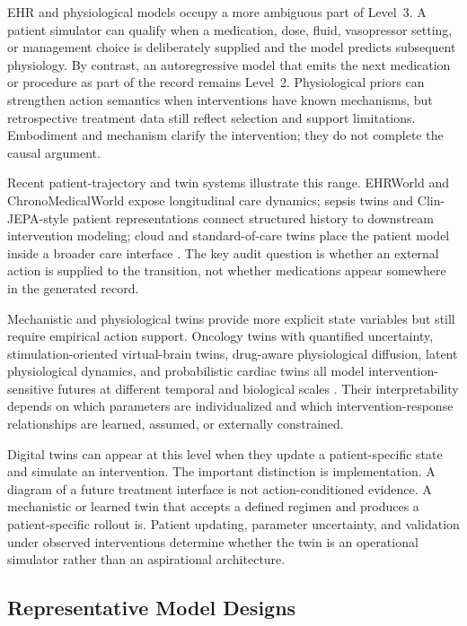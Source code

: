EHR and physiological models occupy a more ambiguous part of Level~3. A patient simulator can qualify when a medication, dose, fluid, vasopressor setting, or management choice is deliberately supplied and the model predicts subsequent physiology. By contrast, an autoregressive model that emits the next medication or procedure as part of the record remains Level~2. Physiological priors can strengthen action semantics when interventions have known mechanisms, but retrospective treatment data still reflect selection and support limitations. Embodiment and mechanism clarify the intervention; they do not complete the causal argument.

Recent patient-trajectory and twin systems illustrate this range. EHRWorld and ChronoMedicalWorld expose longitudinal care dynamics; sepsis twins and Clin-JEPA-style patient representations connect structured history to downstream intervention modeling; cloud and standard-of-care twins place the patient model inside a broader care interface \citep{mu2026ehrworld,wang2026chronomedicalworld,lal2020development,yang2026clin,liu2019novel,bhattacharya2025soc}. The key audit question is whether an external action is supplied to the transition, not whether medications appear somewhere in the generated record.

Mechanistic and physiological twins provide more explicit state variables but still require empirical action support. Oncology twins with quantified uncertainty, stimulation-oriented virtual-brain twins, drug-aware physiological diffusion, latent physiological dynamics, and probabilistic cardiac twins all model intervention-sensitive futures at different temporal and biological scales \citep{pash2026predictive,wang2025virtual,shao2025mm,luo2026toward,giovanis2026probabilistic}. Their interpretability depends on which parameters are individualized and which intervention-response relationships are learned, assumed, or externally constrained.

Digital twins can appear at this level when they update a patient-specific state and simulate an intervention. The important distinction is implementation. A diagram of a future treatment interface is not action-conditioned evidence. A mechanistic or learned twin that accepts a defined regimen and produces a patient-specific rollout is. Patient updating, parameter uncertainty, and validation under observed interventions determine whether the twin is an operational simulator rather than an aspirational architecture.

\subsection{Representative Model Designs}

